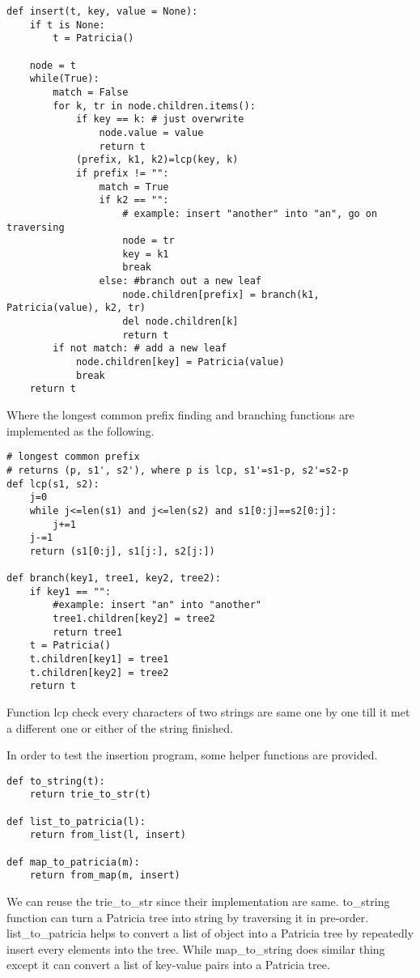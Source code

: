 \documentclass{article}
\begin{document}
\lstset{language=Python}
\begin{lstlisting}
def insert(t, key, value = None):
    if t is None:
        t = Patricia()

    node = t
    while(True):
        match = False
        for k, tr in node.children.items():
            if key == k: # just overwrite
                node.value = value
                return t
            (prefix, k1, k2)=lcp(key, k)
            if prefix != "":
                match = True
                if k2 == "":
                    # example: insert "another" into "an", go on traversing
                    node = tr
                    key = k1
                    break
                else: #branch out a new leaf
                    node.children[prefix] = branch(k1, Patricia(value), k2, tr)
                    del node.children[k]
                    return t
        if not match: # add a new leaf
            node.children[key] = Patricia(value)
            break
    return t
\end{lstlisting}

Where the longest common prefix finding and branching functions are implemented
as the following.

\begin{lstlisting}
# longest common prefix
# returns (p, s1', s2'), where p is lcp, s1'=s1-p, s2'=s2-p
def lcp(s1, s2):
    j=0
    while j<=len(s1) and j<=len(s2) and s1[0:j]==s2[0:j]:
        j+=1
    j-=1
    return (s1[0:j], s1[j:], s2[j:])

def branch(key1, tree1, key2, tree2):
    if key1 == "":
        #example: insert "an" into "another"
        tree1.children[key2] = tree2
        return tree1
    t = Patricia()
    t.children[key1] = tree1
    t.children[key2] = tree2
    return t
\end{lstlisting}

Function lcp check every characters of two strings are same one by one
till it met a different one or either of the string finished.

In order to test the insertion program, some helper functions are
provided.

\begin{lstlisting}
def to_string(t):
    return trie_to_str(t)

def list_to_patricia(l):
    return from_list(l, insert)

def map_to_patricia(m):
    return from_map(m, insert)
\end{lstlisting}

We can reuse the trie\_to\_str since their implementation are same.
to\_string function can turn a Patricia tree into string by traversing it
in pre-order. list\_to\_patricia helps to convert a list of object into
a Patricia tree by repeatedly insert every elements into the tree. While
map\_to\_string does similar thing except it can convert a list of key-value
pairs into a Patricia tree.
\end{document}
